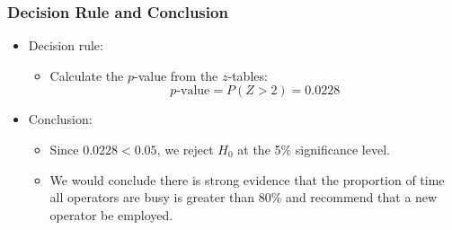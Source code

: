 \documentclass[14pt]{beamer}
\begin{document}
\begin{frame}
	\frametitle{Decision Rule and Conclusion}
	
	\begin{itemize}[label={\color{blue}$\blacktriangleright$}]
		\item Decision rule:
		\begin{itemize}[label={\color{blue}$\blacktriangleright$}]
			\item Calculate the $p$-value from the $z$-tables:
			\[
			p\text{-value} = P(Z > 2) = 0.0228
			\]
		\end{itemize}
		
		\item Conclusion:
		\begin{itemize}[label={\color{blue}$\blacktriangleright$}]
			\item Since $0.0228 < 0.05$, we reject $H_0$ at the 5\% significance level.
			\item We would conclude there is strong evidence that the proportion of time all operators are busy is greater than 80\% and recommend that a new operator be employed.
		\end{itemize}
	\end{itemize}
	
\end{frame}
\end{document}
